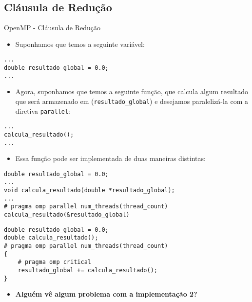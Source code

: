 \subsection{Cláusula de Redução}

\begin{frame}[fragile]{OpenMP - Cláusula de Redução}
	\begin{itemize}
		\item Suponhamos que temos a seguinte variável:
	\end{itemize}
\begin{lstlisting}
...
double resultado_global = 0.0;
...
\end{lstlisting}
\pause
	\begin{itemize}
		\item Agora, suponhamos que temos a seguinte função, que calcula algum resultado que será armazenado em (\texttt{resultado\_global}) e desejamos paralelizá-la com a diretiva \texttt{parallel}:
	\end{itemize}
\begin{lstlisting}
...
calcula_resultado();
...
\end{lstlisting}
\end{frame}

\begin{frame}[fragile]
	\begin{itemize}
		\item Essa função pode ser implementada de duas maneiras distintas:
	\end{itemize}
\fontsize{7.5pt}{7.2}\selectfont
\begin{lstlisting}[caption=Implementação 1]
double resultado_global = 0.0;
...
void calcula_resultado(double *resultado_global);
...
# pragma omp parallel num_threads(thread_count)
calcula_resultado(&resultado_global)
\end{lstlisting}
\pause
\begin{lstlisting}[caption=Implementação 2, label=impl2]
double resultado_global = 0.0;
double calcula_resultado();
# pragma omp parallel num_threads(thread_count)
{
	# pragma omp critical
	resultado_global += calcula_resultado();
}
\end{lstlisting}
\pause
\fontsize{10pt}{7.2}\selectfont
\begin{itemize}
	\item \textbf{{\color{bostonuniversityred} Alguém vê algum problema com a implementação 2?}}
\end{itemize}

\end{frame}

